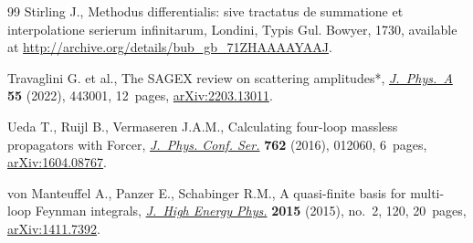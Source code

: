 \documentclass[pdftex]{sigma}
\numberwithin{equation}{section}
\begin{document}
\begin{thebibliography}{99}
Stirling J., Methodus differentialis: sive tractatus de summatione et
 interpolatione serierum infinitarum, Londini, Typis Gul. Bowyer, 1730,
 available at \url{http://archive.org/details/bub_gb_71ZHAAAAYAAJ}.

Travaglini G. et al., The {SAGEX} review on scattering
 amplitudes*, \href{https://doi.org/10.1088/1751-8121/ac8380}{\textit{J.~Phys.~A}} \textbf{55} (2022), 443001, 12~pages,
 \href{https://arxiv.org/abs/2203.13011}{arXiv:2203.13011}.

Ueda T., Ruijl B., Vermaseren J.A.M., Calculating four-loop massless
 propagators with {F}orcer, \href{https://doi.org/10.1088/1742-6596/762/1/012060}{\textit{J.~Phys. Conf. Ser.}} \textbf{762} (2016),
 012060, 6~pages, \href{https://arxiv.org/abs/1604.08767}{arXiv:1604.08767}.

von Manteuffel A., Panzer E., Schabinger R.M., A quasi-finite basis for
 multi-loop {F}eynman integrals, \href{https://doi.org/10.1007/JHEP02(2015)120}{\textit{J.~High Energy Phys.}} \textbf{2015}
 (2015), no.~2, 120, 20~pages, \href{https://arxiv.org/abs/1411.7392}{arXiv:1411.7392}.

\end{thebibliography}\LastPageEnding
\end{document}
